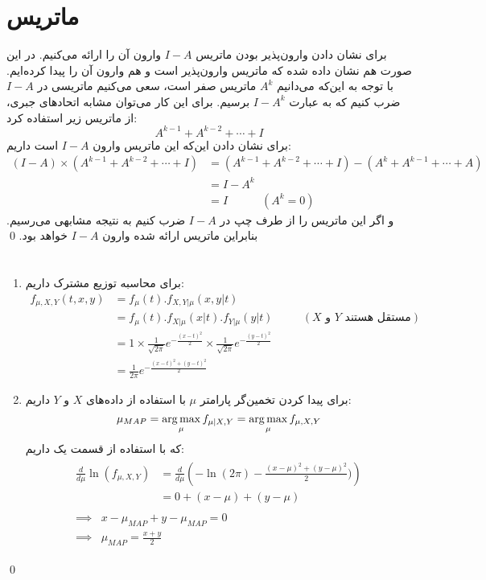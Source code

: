 \documentclass[a4paper, 11pt]{article}
\begin{document}
\section{ماتریس }
برای نشان دادن وارون‌پذیر بودن ماتریس $I - A$ وارون آن را ارائه می‌کنیم. در این صورت هم نشان داده شده که ماتریس وارون‌پذیر است و هم وارون آن را پیدا کرده‌ایم. با توجه به این‌که می‌دانیم $A^k$ ماتریس صفر است، سعی می‌کنیم ماتریسی در $I - A$ ضرب کنیم که به عبارت $I - A^k$ برسیم. برای این کار می‌توان مشابه اتحادهای جبری، از ماتریس زیر استفاده کرد:
\[
A^{k-1} + A^{k - 2} + \cdots + I
\]
برای نشان دادن این‌که این ماتریس وارون $I-A$ است داریم:
\[
\begin{aligned}
	(I - A)\times(A^{k-1} + A^{k - 2} + \cdots + I)	&= (A^{k-1} + A^{k - 2} + \cdots + I) - (A^k + A^{k-1} + \cdots + A) \\
	&= I - A^k \\
	&= I \quad\qquad (A^k = 0)
\end{aligned}
\]
و اگر این ماتریس را از طرف چپ در $I - A$ ضرب کنیم به نتیجه مشابهی می‌رسیم. بنابراین ماتریس ارائه شده وارون $I - A$ خواهد بود.
\qed
\section{}
\begin{enumerate}[1.]
	\item
	برای محاسبه توزیع مشترک داریم:
	\[
	\begin{aligned}
		f_{\mu, X, Y}(t,x,y)	&= f_{\mu}(t).f_{X,Y|\mu}(x,y|t) \\[0.75em]
								&= f_{\mu}(t).f_{X|\mu}(x|t).f_{Y|\mu}(y|t) &&\quad (\text{$X$ و $Y$ مستقل هستند}) \\[0.75em]
								&= 1 \times \frac{1}{\sqrt{2\pi}}e^{-\frac{(x-t)^2}{2}} \times \frac{1}{\sqrt{2\pi}}e^{-\frac{(y-t)^2}{2}} \\[0.75em]
								&= \frac{1}{2\pi}e^{-\frac{(x-t)^2+(y-t)^2}{2}}
	\end{aligned}
	\]
	\item
	برای پیدا کردن تخمین‌گر  پارامتر $\mu$ با استفاده از داده‌های $X$ و $Y$ داریم:
	\[
	\mu_{MAP} = \operatorname*{arg\,max}_{\mu} f_{\mu | X,Y} = \operatorname*{arg\,max}_\mu f_{\mu,X,Y}
	\]
	که با استفاده از قسمت یک داریم:
	\[
	\begin{gathered}
		\begin{aligned}
			\frac{d}{d \mu} \ln(f_{\mu, X, Y})	&= \frac{d}{d \mu} \left(-\ln(2\pi) - \frac{(x-\mu)^2 + (y-\mu)^2}{2})\right)\\
			&= 0 + (x - \mu) + (y - \mu)
		\end{aligned}\\[1em]
		\begin{aligned}
			\implies & x - \mu_{MAP} + y - \mu_{MAP} = 0 \\[0.75em]
			\implies & \mu_{MAP} = \frac{x+y}{2}
		\end{aligned}
	\end{gathered}
	\]
\end{enumerate}
\qed
\end{document}
